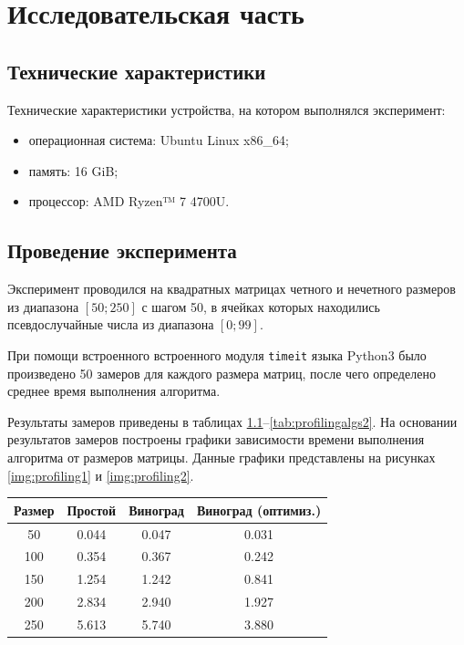 \chapter{Исследовательская часть}

\section{Технические характеристики}

Технические характеристики устройства, на котором выполнялся эксперимент:

\begin{itemize}
	\item операционная система: Ubuntu\cite{ubuntu} Linux x86\_64;
	\item память: 16 GiB;
	\item процессор: AMD Ryzen™ 7 4700U\cite{amd}.
\end{itemize}

\section{Проведение эксперимента}

Эксперимент проводился на квадратных матрицах четного и нечетного размеров из диапазона $[50; 250]$ с шагом 50, в ячейках которых находились 
псевдослучайные числа из диапазона $[0; 99]$.

При помощи встроенного встроенного модуля \texttt{timeit}\cite{timeit} языка Python3 было произведено 50 замеров для 
каждого размера матриц, после чего определено среднее время выполнения алгоритма.

Результаты замеров приведены в таблицах \ref{tab:profilingalgs1}--\ref{tab:profilingalgs2}. На основании результатов 
замеров построены графики зависимости времени выполнения алгоритма от размеров матрицы. Данные графики представлены 
на рисунках \ref{img:profiling1} и \ref{img:profiling2}.

\begin{table}[h]
	\begin{center}
		\begin{tabular}{|c|c|c|c|} 
		 	\hline
			Размер & Простой & Виноград & Виноград (оптимиз.) \\  
		 	\hline
		 	50 & 0.044 & 0.047 & 0.031 \\
		 	\hline
		 	100 & 0.354 & 0.367 & 0.242 \\
		 	\hline
			150 & 1.254 & 1.242 & 0.841 \\
			\hline
			200 & 2.834 & 2.940 & 1.927 \\
			\hline
			250 & 5.613 & 5.740 & 3.880 \\
			\hline
		\end{tabular}
		\label{tab:profilingalgs1}
	\end{center}
\end{table}


